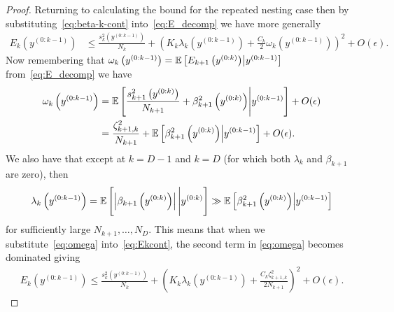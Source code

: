 \begin{proof}
\noindent Returning to calculating the bound for the repeated nesting case then by 
substituting~\eqref{eq:beta-k-cont} into~\eqref{eq:E_decomp} we have more generally
\begin{align}
	E_k \left(y^{(0:k-1)}\right) 
	&\le \frac{s_k^2 \left(y^{(0:k-1)}\right)}{N_k}+ \left(K_k \lambda_k \left(y^{(0:k-1)} \right) +
	\frac{C_k}{2} \omega_k\left(y^{(0:k-1)} \right) \right)^2+O(\epsilon). \label{eq:Ekcont}
	\end{align}
Now remembering that
$\omega_k \left(y^{(0:k-1)}\right) = \mathbb{E} \left[E_{k+1} 
\left(y^{(0:k)}\right) \middle|  y^{(0:k-1)} \right] $ from~\eqref{eq:E_decomp} we have
\begin{align}
	\omega_k\left(y^{(0:k-1)} \right) &= \mathbb{E} \left[\frac{s_{k+1}^2 \left(y^{(0:k)}\right)}{N_{k+1}} + \beta^2_{k+1} 
	\left(y^{(0:k)}\right) \middle|  y^{(0:k-1)} \right] + O(\epsilon) \nonumber \\
	&= \frac{\zeta_{k+1,k}^2}{N_{k+1}}+\mathbb{E} \left[\beta^2_{k+1} 
	\left(y^{(0:k)}\right) \middle|  y^{(0:k-1)} \right] + O(\epsilon).  \label{eq:omega}
\end{align}
We also have that except at $k=D-1$ and $k=D$ (for which both $\lambda_k$ and $\beta_{k+1}$ are zero), then
\[
\lambda_k\left(y^{(0:k-1)} \right) = \mathbb{E} \left[\left|\beta_{k+1} 
\left(y^{(0:k)}\right) \right| \Bigg|  y^{(0:k)}\right] \gg
\mathbb{E} \left[\beta^2_{k+1} 
\left(y^{(0:k)}\right) \middle|  y^{(0:k-1)} \right]
\]
for sufficiently large $N_{k+1},\dots,N_D$.
This means that when we substitute~\eqref{eq:omega} into~\eqref{eq:Ekcont},
the second term in \eqref{eq:omega} becomes dominated giving
\begin{align}
	E_k \left(y^{(0:k-1)}\right) 
	\le\frac{s_k^2 \left(y^{(0:k-1)}\right)}{N_k}
	+\left(K_k \lambda_k \left(y^{(0:k-1)}\right) 
	+\frac{C_k \zeta_{k+1,k}^2}{2 N_{k+1}}\right)^2 + O(\epsilon). \label{eq:E_k_for_sub}
\end{align}

\end{proof}

